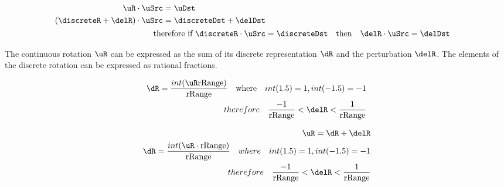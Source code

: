 \newcommand{\tRange}{\text{rRange}}
\newcommand{\dstRange}{\text{dstRange}}


\begin{eqnarray}\label{eq:lxyPixel}
\begin{aligned}
\uR  \cdot \uSrc &= \uDst  \\
(\discreteR + \delR)  \cdot \uSrc &= \discreteDst + \delDst \\
\end{aligned} \\
\text{therefore if } \discreteR \cdot \uSrc &= \discreteDst \quad \text{then}\quad \delR  \cdot \uSrc = \delDst
\end{eqnarray}

The continuous rotation $\uR$ can be expressed as the sum of its discrete representation $\dR$ and the perturbation $\delR$. The elements of the discrete rotation can be expressed as rational fractions.

\begin{eqnarray}\label{eq:dRot}
\dR = \dfrac{int(\uR \tRange)}{\tRange}\quad \text{where}\quad int(1.5) = 1, int (-1.5) = -1\\
therefore\quad \dfrac{-1}{\tRange} < \delR  < \dfrac{1}{\tRange}
\end{eqnarray}

\begin{eqnarray}\label{eq:dRRange}
\uR = \dR + \delR\\
\dR = \dfrac{int(\uR \cdot \tRange)}{\tRange}\quad where\quad int(1.5) = 1, int (-1.5) = -1\\
therefore\quad \dfrac{-1}{\tRange} < \delR  < \dfrac{1}{\tRange}
\end{eqnarray}

